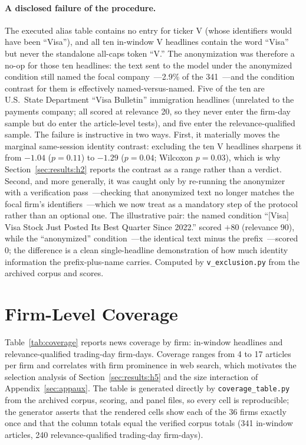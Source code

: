 \paragraph{A disclosed failure of the procedure.} The executed alias table contains no entry for ticker V (whose identifiers would have been ``Visa''), and all ten in-window V headlines contain the word ``Visa'' but never the standalone all-caps token ``V.'' The anonymization was therefore a no-op for those ten headlines: the text sent to the model under the anonymized condition still named the focal company~---2.9\% of the 341~---and the condition contrast for them is effectively named-versus-named. Five of the ten are U.S.\ State Department ``Visa Bulletin'' immigration headlines (unrelated to the payments company; all scored at relevance 20, so they never enter the firm-day sample but do enter the article-level tests), and five enter the relevance-qualified sample. The failure is instructive in two ways. First, it materially moves the marginal same-session identity contrast: excluding the ten V headlines sharpens it from $-1.04$ ($p=0.11$) to $-1.29$ ($p=0.04$; Wilcoxon $p=0.03$), which is why Section~\ref{sec:results:h2} reports the contrast as a range rather than a verdict. Second, and more generally, it was caught only by re-running the anonymizer with a verification pass~---checking that anonymized text no longer matches the focal firm's identifiers~---which we now treat as a mandatory step of the protocol rather than an optional one. The illustrative pair: the named condition ``[Visa] Visa Stock Just Posted Its Best Quarter Since 2022.'' scored $+80$ (relevance 90), while the ``anonymized'' condition~---the identical text minus the prefix~---scored $0$; the difference is a clean single-headline demonstration of how much identity information the prefix-plus-name carries. Computed by \texttt{v\_exclusion.py} from the archived corpus and scores.

\section{Firm-Level Coverage}\label{app:coverage}

Table~\ref{tab:coverage} reports news coverage by firm: in-window headlines and relevance-qualified trading-day firm-days. Coverage ranges from 4 to 17 articles per firm and correlates with firm prominence in web search, which motivates the selection analysis of Section~\ref{sec:results:h5} and the size interaction of Appendix~\ref{sec:appaux}. The table is generated directly by \texttt{coverage\_table.py} from the archived corpus, scoring, and panel files, so every cell is reproducible; the generator asserts that the rendered cells show each of the 36 firms exactly once and that the column totals equal the verified corpus totals (341 in-window articles, 240 relevance-qualified trading-day firm-days).

